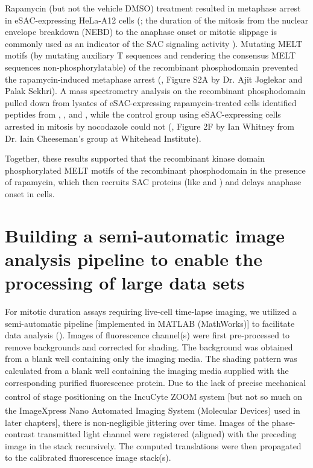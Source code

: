 Rapamycin (but not the vehicle DMSO) treatment resulted in metaphase arrest in eSAC-expressing HeLa-A12 cells (; the duration of the mitosis from the nuclear envelope breakdown (NEBD) to the anaphase onset or mitotic slippage is commonly used as an indicator of the SAC signaling activity \cite{RiederNormalProgression, Rheostat, Ablation}). Mutating MELT motifs (by mutating auxiliary T\textOmega{} sequences \cite{RecombinantKNL1, MELTActivity} and rendering the consensus MELT sequences non-phosphorylatable) of the recombinant phosphodomain prevented the rapamycin-induced metaphase arrest (\cite{eSAC}, Figure S2A by Dr. Ajit Joglekar and Palak Sekhri). A mass spectrometry analysis on the recombinant phosphodomain pulled down from lysates of eSAC-expressing rapamycin-treated cells identified peptides from , , and , while the control group using eSAC-expressing cells arrested in mitosis by nocodazole could not (\cite{eSAC}, Figure 2F by Ian Whitney from Dr. Iain Cheeseman's group at Whitehead Institute).

Together, these results supported that the recombinant  kinase domain phosphorylated MELT motifs of the recombinant  phosphodomain in the presence of rapamycin, which then recruits SAC proteins (like  and ) and delays anaphase onset in cells.

\section{Building a semi-automatic image analysis pipeline to enable the processing of large data sets}
\label{IncuCyteAnalysis}
For mitotic duration assays requiring live-cell time-lapse imaging, we utilized a semi-automatic pipeline [implemented in MATLAB (MathWorks)] to facilitate data analysis (). Images of fluorescence channel(s) were first pre-processed to remove backgrounds and corrected for shading. The background was obtained from a blank well containing only the imaging media. The shading pattern was calculated from a blank well containing the imaging media supplied with the corresponding purified fluorescence protein. Due to the lack of precise mechanical control of stage positioning on the IncuCyte\textsuperscript{\textregistered} ZOOM system [but not so much on the ImageXpress\textsuperscript{\textregistered} Nano Automated Imaging System (Molecular Devices) used in later chapters], there is non-negligible jittering over time. Images of the phase-contrast transmitted light channel were registered (aligned) with the preceding image in the stack recursively. The computed translations were then propagated to the calibrated fluorescence image stack(s).

